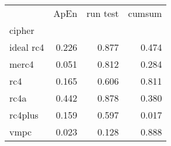 \begin{tabular}{lrrr}
\toprule
 & ApEn & run test & cumsum \\
cipher &  &  &  \\
\midrule
ideal rc4 & 0.226 & 0.877 & 0.474 \\
merc4 & 0.051 & 0.812 & 0.284 \\
rc4 & 0.165 & 0.606 & 0.811 \\
rc4a & 0.442 & 0.878 & 0.380 \\
rc4plus & 0.159 & 0.597 & 0.017 \\
vmpc & 0.023 & 0.128 & 0.888 \\
\bottomrule
\end{tabular}
